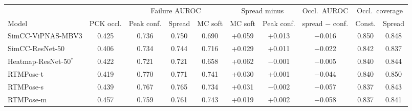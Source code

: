 \begin{tabular}{lccccccccc}
\toprule
& & \multicolumn{3}{c}{Failure AUROC} & \multicolumn{2}{c}{Spread minus} & Occl.\ AUROC & \multicolumn{2}{c}{Occl.\ coverage} \\
\cmidrule(lr){3-5}\cmidrule(lr){6-7}\cmidrule(lr){9-10}
Model & PCK occl. & Peak conf. & Spread & MC soft & MC soft & Peak conf. & spread $-$ conf. & Const. & Spread \\
\midrule
SimCC-ViPNAS-MBV3 & 0.425 & 0.736 & 0.750 & 0.690 & +0.059 & +0.013 & \ensuremath{-}0.016 & 0.850 & 0.848 \\
SimCC-ResNet-50 & 0.406 & 0.734 & 0.744 & 0.716 & +0.029 & +0.011 & \ensuremath{-}0.022 & 0.842 & 0.837 \\
Heatmap-ResNet-50$^{\ast}$ & 0.422 & 0.721 & 0.721 & 0.658 & +0.062 & \ensuremath{-}0.001 & \ensuremath{-}0.005 & 0.840 & 0.844 \\
RTMPose-t & 0.419 & 0.770 & 0.771 & 0.741 & +0.030 & +0.001 & \ensuremath{-}0.044 & 0.840 & 0.850 \\
RTMPose-s & 0.439 & 0.767 & 0.765 & 0.734 & +0.031 & \ensuremath{-}0.002 & \ensuremath{-}0.057 & 0.837 & 0.843 \\
RTMPose-m & 0.457 & 0.759 & 0.761 & 0.743 & +0.019 & +0.002 & \ensuremath{-}0.058 & 0.837 & 0.841 \\
\bottomrule
\end{tabular}
